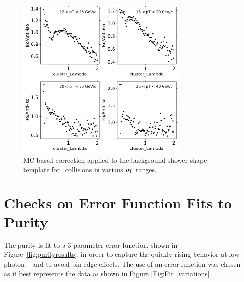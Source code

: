 \begin{figure}
	\center
	\includegraphics[width=0.76\textwidth]{Checks_Systematics/bkg-template-correction-p-Pb}
	\caption{MC-based correction applied to the background shower-shape template for \pPb~collisions in various $p_{\mathrm{T}}$ ranges.}
	\label{fig:bkgCorrection}
\end{figure}

\section{Checks on Error Function Fits to Purity}
The purity is fit to a 3-parameter error function, shown in Figure~\ref{fig:purityresults}, in order to capture the quickly rising behavior at low photon-\pt~ and to avoid bin-edge effects. The use of an error function was chosen as it best represents the data as shown in Figure \ref{Fig:Fit_variations}

